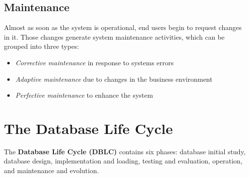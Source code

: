 \documentclass[a4paper, 12pt, titlepage]{report}
\begin{document}
\subsection{Maintenance}
Almost as soon as the system is operational, end users begin to request changes in it. Those changes generate system maintenance activities, which can be grouped into three types:
\begin{itemize}
\item \emph{Corrective maintenance} in response to systems errors
\item \emph{Adaptive maintenance} due to changes in the business environment
\item \emph{Perfective maintenance} to enhance the system
\end{itemize}

\section{The Database Life Cycle}
The \textbf{Database Life Cycle (DBLC)} contains six phases: database initial study, database design, implementation and loading, testing and evaluation, operation, and maintenance and evolution.
\end{document}
